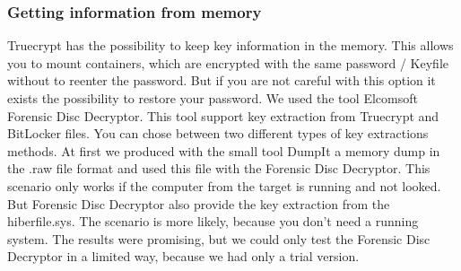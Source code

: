 \subsubsection{Getting information from memory}
Truecrypt has the possibility to keep key information in the memory. This allows you to mount containers, which are encrypted with the same password / Keyfile without to reenter the password. But if you are not careful with this option it exists the possibility to restore your password. We used the tool Elcomsoft Forensic Disc Decryptor.
\cite{elcomsoft:forensicDiskDecrypt} 
This tool support key extraction from Truecrypt and BitLocker files. You can chose between two different types of key extractions methods. At first we produced with the small tool DumpIt a memory dump in the .raw file format and used this file with the Forensic Disc Decryptor.
This scenario only works if the computer from the target is running and not looked. But Forensic Disc Decryptor also provide the key extraction from the hiberfile.sys. The scenario is more likely, because you don't need a running system. 
The results were promising, but we could only test the Forensic Disc Decryptor in a limited way, because we had only a trial version. 



